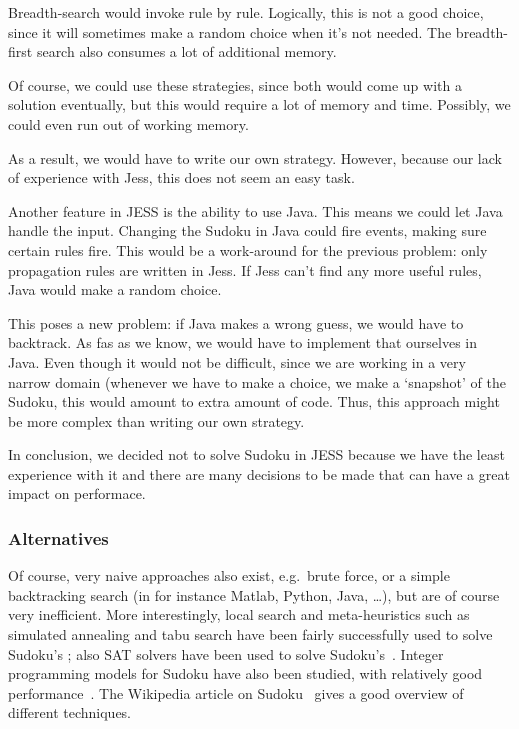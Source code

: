 Breadth-search would invoke rule by rule. Logically, this is not a good choice, since it will sometimes make a random choice when it's not needed. The breadth-first search also consumes a lot of additional memory.

Of course, we could use these strategies, since both would come up with a solution eventually, but this would require a lot of memory and time. Possibly, we could even run out of working memory.

As a result, we would have to write our own strategy. However, because our lack of experience with Jess, this does not seem an easy task.

Another feature in JESS is the ability to use Java. This means we could let Java handle the input. Changing the Sudoku in Java could fire events, making sure certain rules fire. This would be a work-around for the previous problem: only propagation rules are written in Jess. If Jess can't find any more useful rules, Java would make a random choice. 

This poses a new problem: if Java makes a wrong guess, we would have to backtrack. As fas as we know, we would have to implement that ourselves in Java. Even though it would not be difficult, since we are working in a very narrow domain (whenever we have to make a choice, we make a `snapshot' of the Sudoku, this would amount to extra amount of code. Thus, this approach might be more complex than writing our own strategy.

In conclusion, we decided not to solve Sudoku in JESS because we have the least experience with it and there are many decisions to be made that can have a great impact on performace.

\subsubsection{Alternatives}
Of course, very naive approaches also exist, e.g.~brute force, or a simple backtracking search (in for instance Matlab, Python, Java, \ldots{}), but are of course very inefficient. More interestingly, local search and meta-heuristics such as simulated annealing and tabu search have been fairly successfully used to solve Sudoku's \cite{sudokusa}; also SAT solvers have been used to solve Sudoku's~\cite{satsudoku}. Integer programming models for Sudoku have also been studied, with relatively good performance~\cite{integersudoku}.
The Wikipedia article on Sudoku~\cite{wiki:sudoku} gives a good overview of different techniques.

